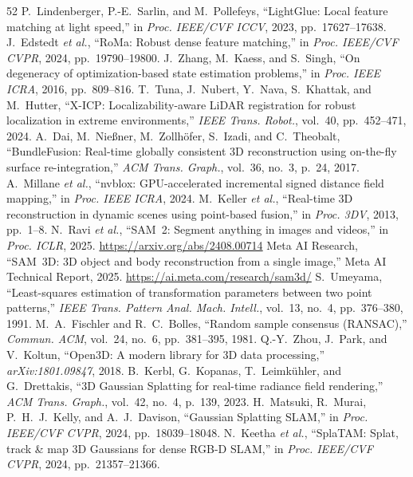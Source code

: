 \documentclass{evidencescene}
\begin{document}
\begin{thebibliography}{52}
 P.~Lindenberger, P.-E.~Sarlin, and M.~Pollefeys, ``LightGlue: Local feature matching at light speed,'' in \emph{Proc. IEEE/CVF ICCV}, 2023, pp.~17627--17638.
 J.~Edstedt \emph{et al.}, ``RoMa: Robust dense feature matching,'' in \emph{Proc. IEEE/CVF CVPR}, 2024, pp.~19790--19800.
 J.~Zhang, M.~Kaess, and S.~Singh, ``On degeneracy of optimization-based state estimation problems,'' in \emph{Proc. IEEE ICRA}, 2016, pp.~809--816.
 T.~Tuna, J.~Nubert, Y.~Nava, S.~Khattak, and M.~Hutter, ``X-ICP: Localizability-aware LiDAR registration for robust localization in extreme environments,'' \emph{IEEE Trans. Robot.}, vol.~40, pp.~452--471, 2024.
 A.~Dai, M.~Nie{\ss}ner, M.~Zollh\"ofer, S.~Izadi, and C.~Theobalt, ``BundleFusion: Real-time globally consistent 3D reconstruction using on-the-fly surface re-integration,'' \emph{ACM Trans. Graph.}, vol.~36, no.~3, p.~24, 2017.
 A.~Millane \emph{et al.}, ``nvblox: GPU-accelerated incremental signed distance field mapping,'' in \emph{Proc. IEEE ICRA}, 2024.
 M.~Keller \emph{et al.}, ``Real-time 3D reconstruction in dynamic scenes using point-based fusion,'' in \emph{Proc. 3DV}, 2013, pp.~1--8.
 N.~Ravi \emph{et al.}, ``SAM~2: Segment anything in images and videos,'' in \emph{Proc. ICLR}, 2025. \url{https://arxiv.org/abs/2408.00714}
 Meta AI Research, ``SAM~3D: 3D object and body reconstruction from a single image,'' Meta AI Technical Report, 2025. \url{https://ai.meta.com/research/sam3d/}
 S.~Umeyama, ``Least-squares estimation of transformation parameters between two point patterns,'' \emph{IEEE Trans. Pattern Anal. Mach. Intell.}, vol.~13, no.~4, pp.~376--380, 1991.
 M.~A.~Fischler and R.~C.~Bolles, ``Random sample consensus (RANSAC),'' \emph{Commun. ACM}, vol.~24, no.~6, pp.~381--395, 1981.
 Q.-Y.~Zhou, J.~Park, and V.~Koltun, ``Open3D: A modern library for 3D data processing,'' \emph{arXiv:1801.09847}, 2018.
 B.~Kerbl, G.~Kopanas, T.~Leimk\"uhler, and G.~Drettakis, ``3D Gaussian Splatting for real-time radiance field rendering,'' \emph{ACM Trans. Graph.}, vol.~42, no.~4, p.~139, 2023.
 H.~Matsuki, R.~Murai, P.~H.~J.~Kelly, and A.~J.~Davison, ``Gaussian Splatting SLAM,'' in \emph{Proc. IEEE/CVF CVPR}, 2024, pp.~18039--18048.
 N.~Keetha \emph{et al.}, ``SplaTAM: Splat, track \& map 3D Gaussians for dense RGB-D SLAM,'' in \emph{Proc. IEEE/CVF CVPR}, 2024, pp.~21357--21366.

\end{thebibliography}
\end{document}
